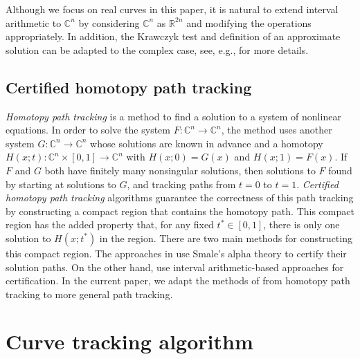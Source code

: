 \begin{remark}
Although we focus on real curves in this paper, it is natural to extend interval arithmetic to $\mathbb{C}^n$ by considering $\mathbb{C}^n$ as $\mathbb{R}^{2n}$ and modifying the operations appropriately.  In addition, the Krawczyk test and definition of an approximate solution can be adapted to the complex case, see, e.g., \cite{Analytic2019,Breiding:2023,guillemot2024validated,duff2024certified} for more details.
\end{remark}

\subsection{Certified homotopy path tracking}

\emph{Homotopy path tracking} is a method to find a solution to a system of nonlinear equations.  In order to solve the system $F:\mathbb{C}^n\rightarrow\mathbb{C}^n$, the method uses another system $G:\mathbb{C}^n\rightarrow\mathbb{C}^n$ whose solutions are known in advance and a homotopy $H(x;t):\mathbb{C}^n\times [0,1]\rightarrow\mathbb{C}^n$ with $H(x;0)=G(x)$ and $H(x;1)=F(x)$.  If $F$ and $G$ both have finitely many nonsingular solutions, then solutions to $F$ found by starting at solutions to $G$, and tracking paths from $t=0$ to $t=1$.  \emph{Certified homotopy path tracking} algorithms guarantee the correctness of this path tracking by constructing a compact region that contains the homotopy path. This compact region has the added property that, for any fixed $t^\ast\in [0,1]$, there is only one solution to $H(x;t^\ast)$ in the region.  There are two main methods for constructing this compact region.  The approaches in \cite{beltran2012certified,beltran2013robust,hauenstein2014posteriori} use Smale's alpha theory to certify their solution paths.  On the other hand, \cite{kearfott1994interval,martin2013certified,Hoeven2015,xu2018approach,duff2024certified,guillemot2024validated} use interval arithmetic-based approaches for certification.  In the current paper, we adapt the methods of \cite{duff2024certified,guillemot2024validated} from homotopy path tracking to more general path tracking.

\section{Curve tracking algorithm}\label{sec:path_tracking_algorithm}

